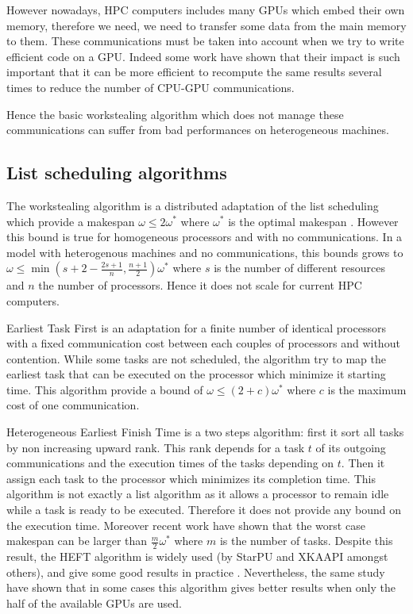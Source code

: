 \documentclass[10pt, conference, compsocconf,pdftex,dvipsnames]{IEEEtran}
\begin{document}
However nowadays, HPC computers includes many GPUs which embed their own
memory, therefore we need, we need to transfer some data from the main memory
to them. These communications must be taken into account when we try to write
efficient code on a GPU.  Indeed some work \cite{venkatasubramanian2009tuned}
have shown that their impact is such important that it can be more efficient
to recompute the same results several times to reduce the number of CPU-GPU
communications.  

Hence the basic workstealing algorithm which does not manage these
communications can suffer from bad performances on heterogeneous machines. 

\subsection{List scheduling algorithms}

The workstealing algorithm is a distributed adaptation of the list scheduling
which provide a makespan $\omega\leq2\omega^*$ where $\omega^*$ is the optimal
makespan \cite{GrahamRL1966Bounds, GrahamRL1969Bounds}. However this bound is
true for homogeneous processors and with no communications. In a model with
heterogenous machines and no communications, this bounds grows to
$\omega\leq\min(s+2-\frac{2s+1}{n},\frac{n+1}{2})\omega^*$ where $s$ is the
number of different resources and $n$ the number of processors. Hence it
does not scale for current HPC computers. 

Earliest Task First\cite{hwang1989scheduling} is an adaptation for a finite
number of identical processors with a fixed communication cost between each
couples of processors and without contention. While some tasks are not
scheduled, the algorithm try to map the earliest task that can be executed on
the processor which minimize it starting time. This algorithm provide a bound
of $\omega\leq(2+c)\omega^*$ where $c$ is the maximum cost of one
communication.  

Heterogeneous Earliest Finish Time \cite{topcuoglu2002performance}  is a two
steps algorithm: first it sort all tasks by non increasing upward rank. This
rank depends for a task $t$ of its outgoing communications and the execution
times of the tasks depending on $t$. Then it assign each task to the processor
which minimizes its completion time. This algorithm is not exactly a list
algorithm as it allows a processor to remain idle while a task is ready to be
executed.  Therefore it does not provide any bound on the execution time.
Moreover recent work \cite{Kedad-SidhoumMonnaMounieEtAl2013} have shown that
the worst case makespan can be larger than $\frac{m}{2}\omega^*$ where
$m$ is the number of tasks. Despite this result, the HEFT algorithm is widely
used (by StarPU and XKAAPI amongst others), and give some good results in
practice \cite{ferreiralima:hal-00735470}. Nevertheless, the same study have
shown that in some cases this algorithm gives better results when only the
half of the available GPUs are used.
\end{document}

